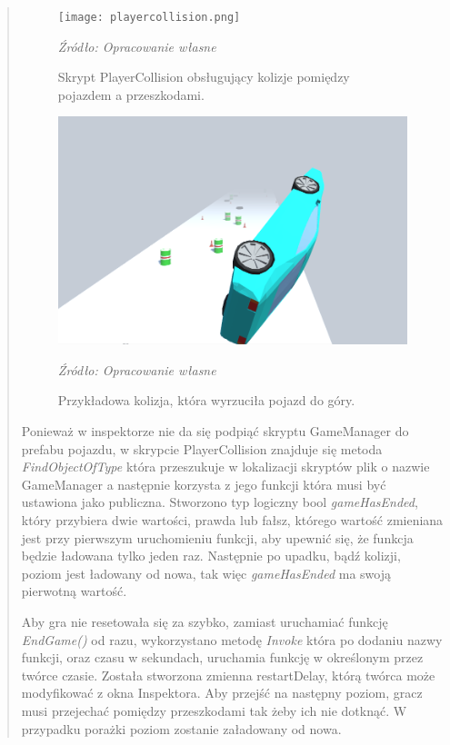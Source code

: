 \begin{quotation}
\begin{figure}[!hbt]
\centering
  \texttt{[image: playercollision.png]}
  \caption{Skrypt PlayerCollision obsługujący kolizje pomiędzy pojazdem a przeszkodami.}\label{rys_24}
  \begin{minipage}[t]{0.75\linewidth}
    \emph{Źródło: Opracowanie własne}
  \end{minipage}
\end{figure}

\newpage
\begin{figure}[!hbt]
\centering
  \includegraphics[width=1\linewidth]{kolizja1.png}
  \caption{Przykładowa kolizja, która wyrzuciła pojazd do góry.}\label{rys_25}
  \begin{minipage}[t]{0.75\linewidth}
    \emph{Źródło: Opracowanie własne}
  \end{minipage}
\end{figure}

\indent Ponieważ w inspektorze nie da się podpiąć skryptu GameManager do prefabu pojazdu, w skrypcie PlayerCollision znajduje się metoda \textit{FindObjectOfType} która przeszukuje w lokalizacji skryptów plik o nazwie GameManager a następnie korzysta z jego funkcji która musi być ustawiona jako publiczna. Stworzono typ logiczny bool \textit{gameHasEnded}, który przybiera dwie wartości, prawda lub fałsz, którego wartość zmieniana jest przy pierwszym uruchomieniu funkcji, aby upewnić się, że funkcja będzie ładowana tylko jeden raz. Następnie po upadku, bądź kolizji, poziom jest ładowany od nowa, tak więc \textit{gameHasEnded} ma swoją pierwotną wartość. 

\newpage
\indent Aby gra nie resetowała się za szybko, zamiast uruchamiać funkcję \textit{EndGame()} od razu, wykorzystano metodę \textit{Invoke} która po dodaniu nazwy funkcji, oraz czasu w sekundach, uruchamia funkcję w określonym przez twórce czasie. Została stworzona zmienna restartDelay, którą twórca może modyfikować z okna Inspektora. Aby przejść na następny poziom, gracz musi przejechać pomiędzy przeszkodami tak żeby ich nie dotknąć. W przypadku porażki poziom zostanie załadowany od nowa.


\end{quotation}
